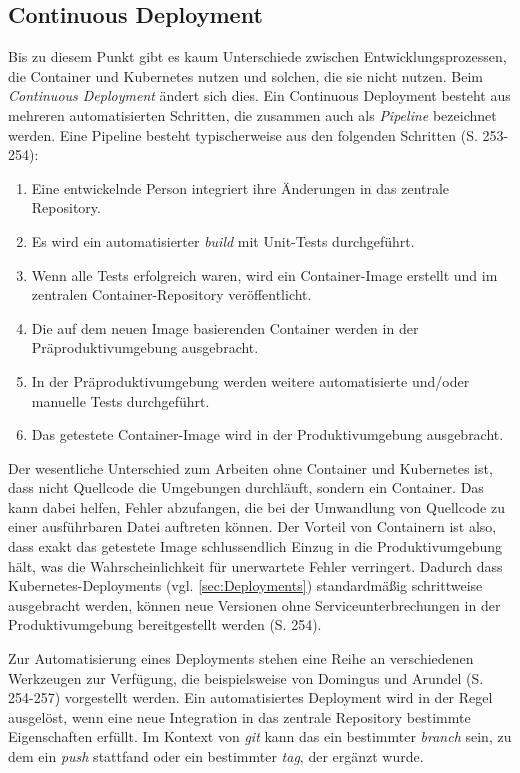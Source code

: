 \documentclass[11pt,a4paper]{article}
\begin{document}
\subsection{Continuous Deployment}
Bis zu diesem Punkt gibt es kaum Unterschiede zwischen Entwicklungsprozessen,
die Container und Kubernetes nutzen und solchen, die sie nicht nutzen.
Beim \emph{Continuous Deployment} ändert sich dies.
Ein Continuous Deployment besteht aus mehreren automatisierten Schritten,
die zusammen auch als \emph{Pipeline} bezeichnet werden.
Eine Pipeline besteht typischerweise aus den folgenden Schritten \cite{domingus2022cloud} (S. 253-254):
\begin{enumerate}
  \item Eine entwickelnde Person integriert ihre Änderungen in das zentrale Repository.
  \item Es wird ein automatisierter \emph{build} mit Unit-Tests durchgeführt.
  \item Wenn alle Tests erfolgreich waren, wird ein Container-Image erstellt und im zentralen Container-Repository veröffentlicht.
  \item Die auf dem neuen Image basierenden Container werden in der Präproduktivumgebung ausgebracht.
  \item In der Präproduktivumgebung werden weitere automatisierte und/oder manuelle Tests durchgeführt.
  \item Das getestete Container-Image wird in der Produktivumgebung ausgebracht.
\end{enumerate}
Der wesentliche Unterschied zum Arbeiten ohne Container und Kubernetes ist, dass nicht Quellcode
die Umgebungen durchläuft, sondern ein Container. Das kann dabei helfen, Fehler abzufangen,
die bei der Umwandlung von Quellcode zu einer ausführbaren Datei auftreten können.
Der Vorteil von Containern ist also, dass exakt das getestete Image schlussendlich
Einzug in die Produktivumgebung hält, was die Wahrscheinlichkeit für unerwartete Fehler verringert.
Dadurch dass Kubernetes-Deployments (vgl. \ref{sec:Deployments}) standardmäßig schrittweise ausgebracht werden,
können neue Versionen ohne Serviceunterbrechungen in der Produktivumgebung bereitgestellt werden \cite{domingus2022cloud} (S. 254).

Zur Automatisierung eines Deployments stehen eine Reihe an verschiedenen Werkzeugen
zur Verfügung, die beispielsweise von Domingus und Arundel \cite{domingus2022cloud} (S. 254-257)
vorgestellt werden. Ein automatisiertes Deployment wird in der Regel ausgelöst,
wenn eine neue Integration in das zentrale Repository bestimmte Eigenschaften erfüllt.
Im Kontext von \emph{git} kann das ein bestimmter \emph{branch} sein, zu dem
ein \emph{push} stattfand oder ein bestimmter \emph{tag}, der ergänzt wurde.
\end{document}
